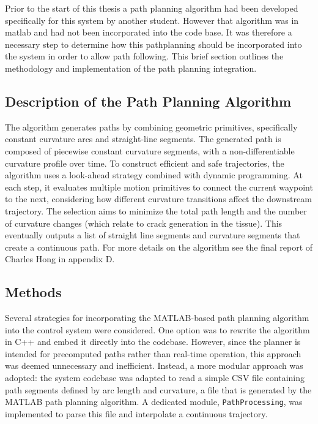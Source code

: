 Prior to the start of this thesis a path planning algorithm had been developed specifically for this system by another student. However that algorithm was in matlab and had not been incorporated into the code base. It was therefore a necessary step to determine how this pathplanning should be incorporated into the system in order to allow path following. This brief section outlines the methodology and implementation of the path planning integration.

\subsection{Description of the Path Planning Algorithm}
The algorithm generates paths by combining geometric primitives, specifically constant curvature arcs and straight-line segments. The generated path is composed of piecewise constant curvature segments, with a non-differentiable curvature profile over time. To construct efficient and safe trajectories, the algorithm uses a look-ahead strategy combined with dynamic programming. At each step, it evaluates multiple motion primitives to connect the current waypoint to the next, considering how different curvature transitions affect the downstream trajectory. The selection aims to minimize the total path length and the number of curvature changes (which relate to crack generation in the tissue). This eventually outputs a list of straight line segments and curvature segments that create a continuous path. For more details on the algorithm see the final report of Charles Hong in appendix D.

\subsection{Methods}
Several strategies for incorporating the MATLAB-based path planning algorithm into the control system were considered. One option was to rewrite the algorithm in C++ and embed it directly into the codebase. However, since the planner is intended for precomputed paths rather than real-time operation, this approach was deemed unnecessary and inefficient.
\newline \newline
Instead, a more modular approach was adopted: the system codebase was adapted to read a simple CSV file containing path segments defined by arc length and curvature, a file that is generated by the MATLAB path planning algorithm. A dedicated module, \texttt{PathProcessing}, was implemented to parse this file and interpolate a continuous trajectory. 

